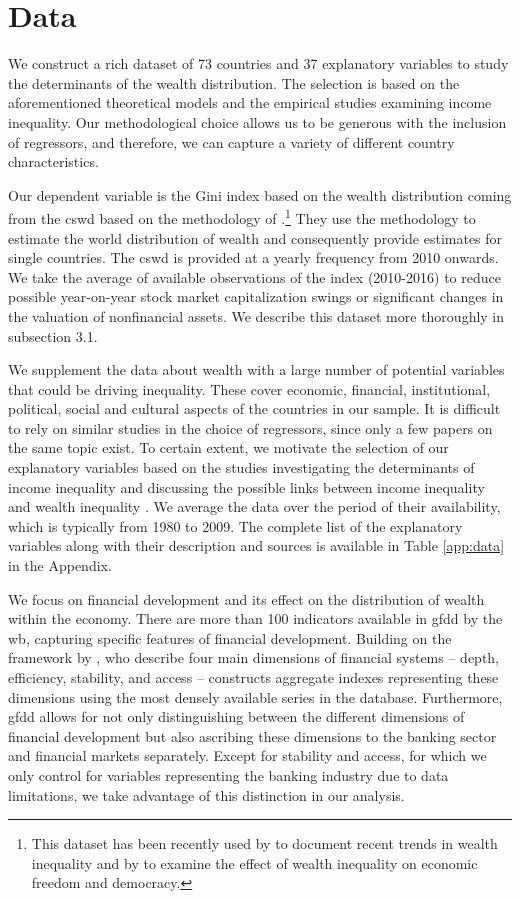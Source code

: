 \documentclass[a4paper,11pt]{article}
\begin{document}
\section{Data}
\label{sec:data}
We construct a rich dataset of 73 countries and 37 explanatory variables to study the determinants of the wealth distribution. The selection is based on the aforementioned theoretical models and the empirical studies examining income inequality. Our methodological choice allows us to be generous with the inclusion of regressors, and therefore, we can capture a variety of different country characteristics. 

Our dependent variable is the Gini index based on the wealth distribution coming from the \ac{cswd} based on the methodology of \citet{daviesetal2011,daviesetal2017}.\footnote{This dataset has been recently used by \citet{anand} to document recent trends in wealth inequality and by \citet{islam} to examine the effect of wealth inequality on economic freedom and democracy.} They use the methodology to estimate the world distribution of wealth and consequently provide estimates for single countries. The \ac{cswd} is provided at a yearly frequency from 2010 onwards. We take the average of available observations of the index (2010-2016) to reduce possible year-on-year stock market capitalization swings or significant changes in the valuation of nonfinancial assets. We describe this dataset more thoroughly in subsection 3.1.

We supplement the data about wealth with a large number of potential variables that could be driving inequality. These cover economic, financial, institutional, political, social and cultural aspects of the countries in our sample. It is difficult to rely on similar studies in the choice of regressors, since only a few papers on the same topic exist. To certain extent, we motivate the selection of our explanatory variables based on the studies investigating the determinants of income inequality and discussing the possible links between income inequality and wealth inequality \citep{roine2015long,de2017finance}. We average the data over the period of their availability, which is typically from 1980 to 2009. The complete list of the explanatory variables along with their description and sources is available in Table \ref{app:data} in the Appendix.

We focus on financial development and its effect on the distribution of wealth within the economy. There are more than 100 indicators available in \ac{gfdd} by the \ac{wb}, capturing specific features of financial development. Building on the framework by \citet{Cihaketal2013}, who describe four main dimensions of financial systems -- depth, efficiency, stability, and access -- \citet{svirydzenka2016introducing} constructs aggregate indexes representing these dimensions using the most densely available series in the database. Furthermore, \ac{gfdd} allows for not only distinguishing between the different dimensions of financial development but also ascribing these dimensions to the banking sector and financial markets separately. Except for stability and access, for which we only control for variables representing the banking industry due to data limitations, we take advantage of this distinction in our analysis.
\end{document}
